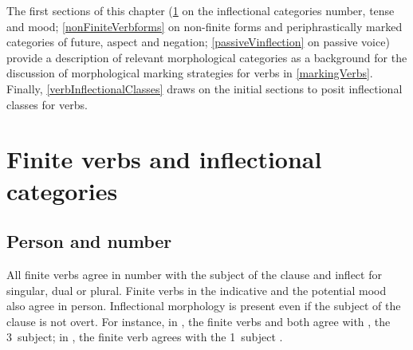 The first sections of this chapter (\SEC\ref{inflectionalCatsVerbs} on the inflectional categories number, tense and mood; \SEC\ref{nonFiniteVerbforms} on non-finite forms and periphrastically marked categories of future, aspect and negation; \SEC\ref{passiveVinflection} on passive voice) provide a description of relevant morphological categories as a background for the discussion of morphological marking strategies for verbs in \SEC\ref{markingVerbs}. Finally, \SEC\ref{verbInflectionalClasses} draws on the initial sections to posit inflectional classes for verbs. 


\section{Finite verbs and inflectional categories}\label{inflectionalCatsVerbs}


\subsection{Person and number}\label{personNumberVerbs}
All finite verbs agree in number with the subject of the clause and inflect for singular, dual or plural. 
Finite verbs in the indicative and the potential mood also agree in person. %
Inflectional morphology is present even if the subject of the clause is not overt. 
For instance, in , the finite verbs  and  both agree with , the 3\PLs\ subject; in , the finite verb  agrees with the 1\DUs\ subject .

